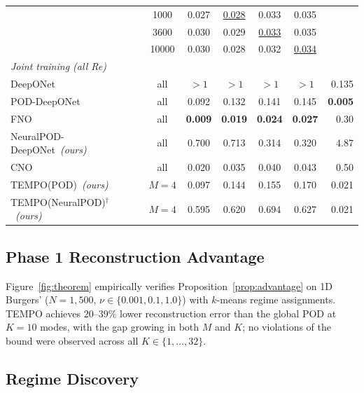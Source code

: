 \documentclass[preprint,10pt]{elsarticle}
\begin{document}
\begin{table}[!htbp]
\begin{tabular}{l c c c c c r}
  & 1000  & 0.027 & \underline{0.028} & 0.033 & 0.035 & \\
  & 3600  & 0.030 & 0.029 & \underline{0.033} & 0.035 & \\
  & 10000 & 0.030 & 0.028 & 0.032 & \underline{0.034} & \\
\midrule
\multicolumn{7}{l}{\textit{Joint training (all Re)}} \\[2pt]
DeepONet~\cite{Lu2019}
  & all & ${>}1$ & ${>}1$ & ${>}1$ & ${>}1$ & 0.135 \\
POD-DeepONet~\cite{Lu2022}
  & all & 0.092 & 0.132 & 0.141 & 0.145 & \textbf{0.005} \\
FNO~\cite{Li2021}
  & all & \textbf{0.009} & \textbf{0.019} & \textbf{0.024} & \textbf{0.027} & 0.30 \\
NeuralPOD-DeepONet~\textit{(ours)}
  & all & 0.700 & 0.713 & 0.314 & 0.320 & 4.87 \\
CNO~\cite{Raonic2023}
  & all & 0.020 & 0.035 & 0.040 & 0.043 & 0.50 \\
TEMPO(POD)~\textit{(ours)}
  & $M{=}4$ & 0.097 & 0.144 & 0.155 & 0.170 & 0.021 \\
TEMPO(NeuralPOD)$^\dagger$~\textit{(ours)}
  & $M{=}4$ & 0.595 & 0.620 & 0.694 & 0.627 & 0.021 \\
\bottomrule
\end{tabular}
\end{table}

\subsection{Phase 1 Reconstruction Advantage}
\label{sec:phase1_exp}

Figure~\ref{fig:theorem} empirically verifies Proposition~\ref{prop:advantage}
on 1D Burgers' ($N{=}1{,}500$, $\nu\in\{0.001,0.1,1.0\}$) with $k$-means regime
assignments.
TEMPO achieves $20$--$39\%$ lower reconstruction error than the global POD at $K{=}10$
modes, with the gap growing in both $M$ and $K$; no violations of the bound were
observed across all $K\in\{1,\ldots,32\}$.

\subsection{Regime Discovery}
\label{sec:regime_exp}
\end{document}
